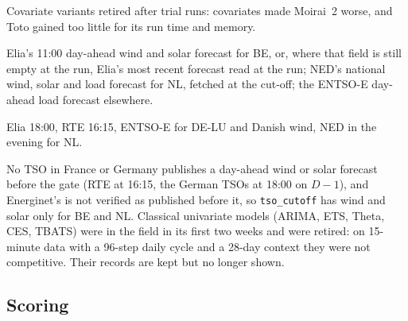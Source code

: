\documentclass[11pt,a4paper]{article}
\newcommand{\m}[1]{\texttt{#1}}
\begin{document}
\begin{table}[!tp]
\begin{threeparttable}
\begin{tablenotes}
\item[d] Covariate variants retired after trial runs: covariates made Moirai~2 worse, and Toto gained too little for
its run time and memory.
\item[e] Elia's 11:00 day-ahead wind and solar forecast for BE, or, where that field is still empty at the run, Elia's most recent forecast read at the run; NED's national wind, solar and load forecast for NL,
fetched at the cut-off; the ENTSO-E day-ahead load forecast elsewhere.
\item[f] Elia 18:00, RTE 16:15, ENTSO-E for DE-LU and Danish wind, NED in the evening for NL.
\end{tablenotes}
\end{threeparttable}
\end{table}

No TSO in France or Germany publishes a day-ahead wind or solar forecast before the gate (RTE at 16:15, the German
TSOs at 18:00 on $D-1$), and Energinet's is not verified as published before it, so \m{tso\_cutoff} has wind and solar only for BE and NL. Classical
univariate models (ARIMA, ETS, Theta, CES, TBATS) were in the field in its first two weeks and were retired: on
15-minute data with a 96-step daily cycle and a 28-day context they were not competitive. Their records are kept but
no longer shown.

\subsection{Scoring}
\end{document}

